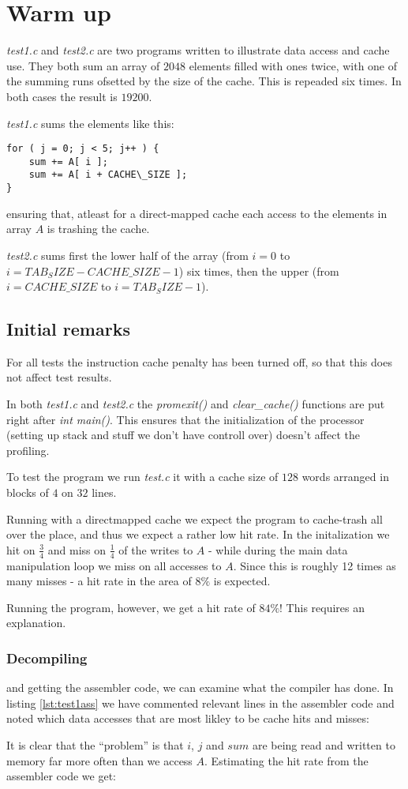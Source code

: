 \section{Warm up}
\emph{test1.c} and \emph{test2.c} are two programs written to illustrate data
access and cache use. They both sum an array of $2048$ elements filled with ones
twice, with one of the summing runs ofsetted by the size of the cache. This is repeaded six
times. In both cases the result is $19200$.

\emph{test1.c} sums the elements like this:
\begin{lstlisting}
for ( j = 0; j < 5; j++ ) {
	sum += A[ i ];
	sum += A[ i + CACHE\_SIZE ];
}
\end{lstlisting}
ensuring that, atleast for a direct-mapped cache each access to the elements in
array $A$ is trashing the cache.

\emph{test2.c} sums first the lower half of the array (from $i=0$ to
$i=TAB_SIZE-CACHE\_SIZE-1$) six times, then the upper (from $i=CACHE\_SIZE$ to
$i=TAB_SIZE-1$).

\subsection{Initial remarks}
For all tests the instruction cache penalty has been turned off, so that this
does not affect test results.

In both \emph{test1.c} and \emph{test2.c} the \emph{promexit()} and
\emph{clear\_cache()} functions are put right after \emph{int main()}. This
ensures that the initialization of the processor (setting up stack and stuff we
don't have controll over) doesn't affect the profiling.

To test the program we run \emph{test.c} it with a cache size of $128$ words
arranged in blocks of $4$ on $32$ lines.

Running with a directmapped cache we expect the program to cache-trash all over
the place, and thus we expect a rather low hit rate. In the initalization we hit
on $\frac{3}{4}$ and miss on $\frac{1}{4}$ of the writes to $A$ - while during
the main data manipulation loop we miss on all accesses to $A$. Since this is
roughly 12 times as many misses - a hit rate in the area of $8\%$ is expected. 

Running the program, however, we get a hit rate of $84\%$! This requires an
explanation.
\subsubsection{Decompiling} and getting the assembler code, we can examine what
the compiler has done. In listing \ref{lst:test1ass} we have commented relevant
lines in the assembler code and noted which data accesses that are most likley
to be cache hits and misses:

It is clear that the ``problem'' is that $i$, $j$ and $sum$ are being read and
written to memory far more often than we access $A$.
Estimating the hit rate from the assembler code we get:

